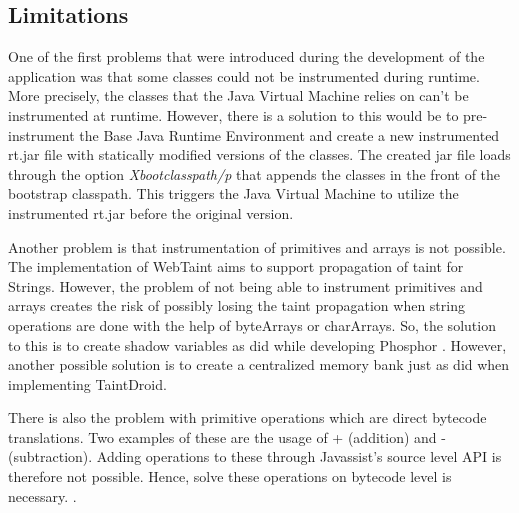 \subsection{Limitations}
\label{NotableProblems}
One of the first problems that were introduced during the development of the application was that some classes could not be instrumented during runtime. More precisely, the classes that the Java Virtual Machine relies on can't be instrumented at runtime. However, there is a solution to this would be to pre-instrument the Base Java Runtime Environment and create a new instrumented rt.jar file with statically modified versions of the classes. The created jar file loads through the option \textit{Xbootclasspath/p} \parencite{xboot} that appends the classes in the front of the bootstrap classpath. This triggers the Java Virtual Machine to utilize the instrumented rt.jar before the original version.

Another problem is that instrumentation of primitives and arrays is not possible. The implementation of WebTaint aims to support propagation of taint for Strings. However, the problem of not being able to instrument primitives and arrays creates the risk of possibly losing the taint propagation when string operations are done with the help of byteArrays or charArrays. So, the solution to this is to create shadow variables as \textcite{BellJ.2014PIdd} did while developing Phosphor \parencite{phosphor}. However, another possible solution is to create a centralized memory bank just as \textcite{EnckWilliam2014Taif} did when implementing TaintDroid.

There is also the problem with primitive operations which are direct bytecode translations. Two examples of these are the usage of + (addition) and - (subtraction). Adding operations to these through Javassist's source level API is therefore not possible. Hence, solve these operations on bytecode level is necessary. \parencite{Javassist}.